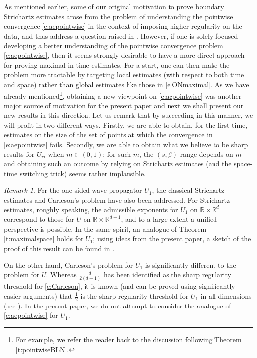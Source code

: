 \documentclass[a4paper]{amsart}
\numberwithin{equation}{section}%
\theoremstyle{plain}%
\theoremstyle{definition}
\theoremstyle{remark}%
\newtheorem*{remark}{Remark}
\begin{document}
As mentioned earlier, some of our original motivation to prove boundary Strichartz estimates arose from the problem of understanding the pointwise convergence \eqref{e:aepointwise} in the context of imposing higher regularity on the data, and thus address a question raised in \cite{BLN_Selecta}. However, if one is solely focused developing a better understanding of the pointwise convergence problem \eqref{e:aepointwise}, then it seems strongly desirable to have a more direct approach for proving maximal-in-time estimates. For a start, one can then make the problem more tractable by targeting local estimates (with respect to both time and space) rather than global estimates like those in \eqref{e:ONmaximal}. As we have already mentioned\footnote{For example, we refer the reader back to the discussion following Theorem \ref{t:pointwiseBLN}.}, obtaining a new viewpoint on \eqref{e:aepointwise} was another major source of motivation for the present paper and next we shall present our new results in this direction. Let us remark that by succeeding in this manner, we will profit in two different ways. Firstly, we are able to obtain, for the first time, estimates on the size of the set of points at which the convergence in \eqref{e:aepointwise} fails. Secondly, we are able to obtain what we believe to be sharp results for $U_m$ when $m \in (0,1)$; for such $m$, the $(s,\beta)$ range depends on $m$ and obtaining such an outcome by relying on Strichartz estimates (and the space-time switching trick) seems rather implausible.

\begin{remark}
For the one-sided wave propagator $U_1$, the classical Strichartz estimates and Carleson's problem have also been addressed. For Strichartz estimates, roughly speaking, the admissible exponents for $U_1$ on $\mathbb{R} \times \mathbb{R}^d$ correspond to those for $U$ on  $\mathbb{R} \times \mathbb{R}^{d-1}$, and to a large extent a unified perspective is possible. In the same spirit, an analogue of Theorem \ref{t:maximalspace} holds for $U_1$; using ideas from the present paper, a sketch of the proof of this result can be found in \cite{BKS_RIMS}. 

On the other hand, Carleson's problem for $U_1$ is significantly different to the problem for $U$. Whereas $\frac{d}{2(d + 1)}$ has been identified as the sharp regularity threshold for \eqref{e:Carleson}, it is known (and can be proved using significantly easier arguments) that $\frac{1}{2}$ is the sharp regularity threshold for $U_1$ in all dimensions (see \cite{Cowling, Wl97}). In the present paper, we do not attempt to consider the analogue of \eqref{e:aepointwise} for $U_1$.
\end{remark}
\end{document}

